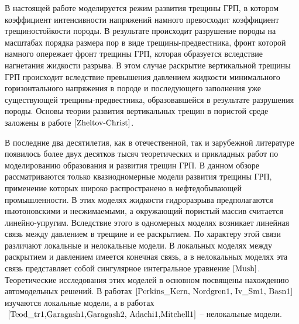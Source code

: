 




\maketitle












В настоящей работе моделируется режим развития трещины ГРП, в котором коэффициент интенсивности напряжений намного превосходит коэффициент трещиностойкости породы. В результате происходит разрушение породы на масштабах порядка размера пор в виде трещины-предвестника, фронт которой намного опережает фронт трещины ГРП, которая образуется вследствие нагнетания жидкости разрыва. В этом случае раскрытие вертикальной трещины ГРП происходит вследствие превышения давлением жидкости минимального горизонтального напряжения в породе и последующего заполнения уже существующей трещины-предвестника, образовавшейся в результате разрушения породы. Основы теории развития вертикальных трещин в пористой среде заложены в работе$ ~\cite{Zheltov-Christ} $.



В последние два десятилетия, как в отечественной, так и зарубежной литературе появилось более двух десятков тысяч теоретических и прикладных работ по моделированию образования и развития трещин ГРП. В данном обзоре рассматриваются только квазиодномерные модели развития трещины ГРП, применение которых широко распространено в нефтедобывающей промышленности. В этих моделях жидкости гидроразрыва предполагаются ньютоновскими и несжимаемыми, а окружающий пористый массив считается линейно-упругим. Вследствие этого в одномерных моделях возникает линейная связь между давлением в трещине и ее раскрытием. По характеру этой связи различают локальные и нелокальные модели. В локальных моделях между раскрытием и давлением имеется конечная связь, а в нелокальных моделях эта связь представляет собой сингулярное интегральное уравнение$~\cite{Mush}$. Теоретические исследования этих моделей в основном посвящены нахождению автомодельных решений. В работах$~\cite{Perkins_Kern, Nordgren1, Iv_Sm1, Basn1}$  изучаются локальные модели, а в работах$~\cite{Teod_tr1,Garagash1,Garagash2, Adachi1,Mitchell1}$ – нелокальные модели.



